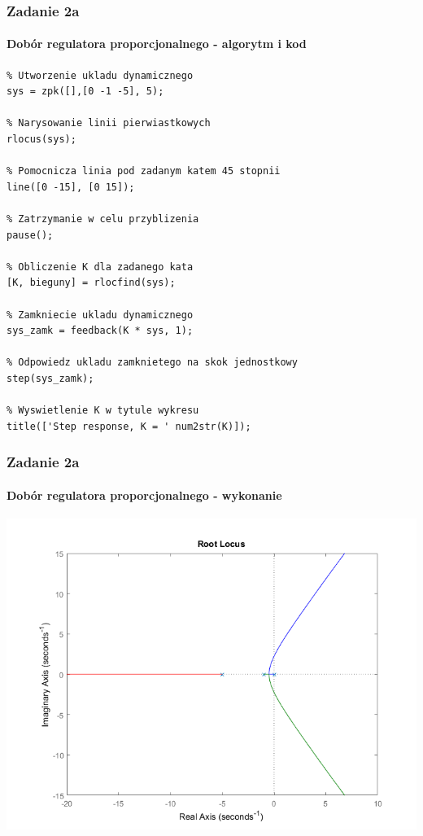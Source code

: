\documentclass{beamer}
\begin{document}
\begin{frame}[fragile]\frametitle{Zadanie 2a}\framesubtitle{Dobór regulatora proporcjonalnego - algorytm i kod}
	\begin{lstlisting}
% Utworzenie ukladu dynamicznego
sys = zpk([],[0 -1 -5], 5);

% Narysowanie linii pierwiastkowych
rlocus(sys);

% Pomocnicza linia pod zadanym katem 45 stopnii
line([0 -15], [0 15]);           

% Zatrzymanie w celu przyblizenia
pause();                            

% Obliczenie K dla zadanego kata
[K, bieguny] = rlocfind(sys);       

% Zamkniecie ukladu dynamicznego
sys_zamk = feedback(K * sys, 1);    

% Odpowiedz ukladu zamknietego na skok jednostkowy
step(sys_zamk);                     

% Wyswietlenie K w tytule wykresu
title(['Step response, K = ' num2str(K)]);
	\end{lstlisting}
\end{frame}

\begin{frame}\frametitle{Zadanie 2a}\framesubtitle{Dobór regulatora proporcjonalnego - wykonanie}
\centering	\includegraphics[scale=0.5]{a-rlocus-bez-linii.png}
\end{frame}
\end{document}
